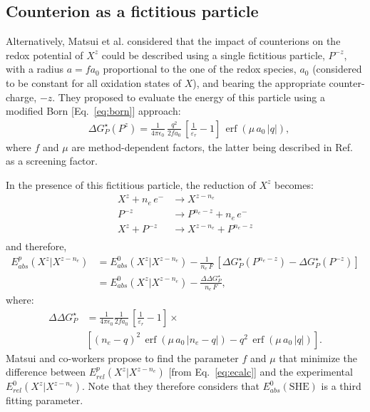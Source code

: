 \documentclass[review]{elsarticle}
\DeclareMathOperator{\erf}{erf}
\begin{document}
\subsection{Counterion as a fictitious particle}

Alternatively, Matsui et al. \cite{matsuiDensityFunctionalTheory2013} considered that the impact of counterions on the redox potential of $X^z$ could be described using a single fictitious particle, $P^{-z}$, with a radius $a=fa_0$ proportional to the one of the redox species, $a_0$  (considered to be constant for all oxidation states of $X$), and bearing the appropriate counter-charge, $-z$. They proposed to evaluate the energy of this particle using a modified Born [Eq.~\eqref{eq:born}] approach:\begin{align}
	&\Delta G^\star_{P}(P^z) = \frac{1}{4\pi\epsilon_0}\, \frac{q^2}{2fa_0}\,\left[\frac{1}{\varepsilon_r}-1\right]\,\erf(\mu\,a_0\,|q|),
\end{align}
where  $f$ and $\mu$ are method-dependent factors, the latter being described in Ref.~\cite{matsuiDensityFunctionalTheory2013} as a screening factor. 

In the presence of this fictitious particle, the reduction of $X^z$ becomes:\begin{equation}
	\begin{array}{rl}
		X^z + n_e\,e^- &\rightarrow X^{z-n_e} \\
		P^{-z} \phantom{ + n_e\,e^-} &\rightarrow P^{n_e-z} + n_e\,e^- \\
		\hline
		X^z + P^{-z}&\rightarrow X^{z-n_e} +P^{n_e-z}\\
	\end{array}  \label{eq:corr}
\end{equation}
and therefore,\begin{align}
	E^p_{abs}(X^z|X^{z-n_e}) &= 	E_{abs}^0(X^{z}|X^{z-n_e}) -\frac{1}{n_e\,F}\,[\Delta G^\star_{P}(P^{n_e-z}) - \Delta G^\star_{P}(P^{-z})] \nonumber\\
	&= 	E_{abs}^0(X^{z}|X^{z-n_e}) -\frac{\Delta\Delta G^\star_P}{n_e\,F}, \label{eq:matsui} 
\end{align}
where:\begin{align}
	\Delta\Delta G^\star_P&=\frac{1}{4\pi\epsilon_0}\frac{1}{2fa_0}\,\left[\frac{1}{\varepsilon_r}-1\right]\times\nonumber\\
	&\left[ (n_e-q)^2\,\erf(\mu\,a_0\,|n_e-q|)-q^2\,\erf(\mu\,a_0\,|q|)\right].
\end{align}
Matsui and co-workers propose to  find the parameter $f$ and $\mu$ that minimize the difference between $E^p_{rel}(X^z|X^{z-n_e})$  [from Eq.~\eqref{eq:ecalc}] and the experimental $E^0_{rel}(X^z|X^{z-n_e})$.  Note that they therefore considers that $ E^{0}_{abs}(\text{SHE})$ is a third fitting parameter.
\end{document}
